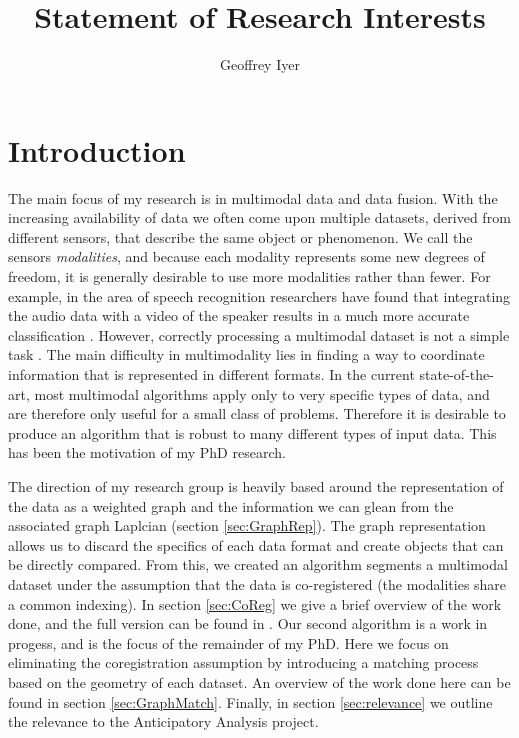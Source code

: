 \documentclass[journal]{IEEEtran}
\title{Statement of Research Interests}
\author{Geoffrey Iyer} \date{}
\begin{document}
\maketitle
\vspace*{-2cm}


\section{Introduction}
\label{sec:intro}

The main focus of my research is in multimodal data and data fusion. With the
increasing availability of data we often come upon multiple datasets, derived
from different sensors, that describe the same object or phenomenon. We call the
sensors \emph{modalities}, and because each modality represents some new degrees
of freedom, it is generally desirable to use more modalities rather than fewer.
For example, in the area of speech recognition researchers have found that
integrating the audio data with a video of the speaker results in a much more
accurate classification \cite{Potamianos03}. However, correctly processing a
multimodal dataset is not a simple task \cite{lahat:hal-01062366}. The main
difficulty in multimodality lies in finding a way to coordinate information that
is represented in different formats. In the current state-of-the-art, most
multimodal algorithms apply only to very specific types of data, and are
therefore only useful for a small class of problems. Therefore it is desirable
to produce an algorithm that is robust to many different types of input
data. This has been the motivation of my PhD research.

The direction of my research group is heavily based around the representation of
the data as a weighted graph and the information we can glean from the
associated graph Laplcian (section \ref{sec:GraphRep}). The graph representation
allows us to discard the specifics of each data format and create objects that
can be directly compared. From this, we created an algorithm segments a
multimodal dataset under the assumption that the data is co-registered (the
modalities share a common indexing).  In section \ref{sec:CoReg} we give a brief
overview of the work done, and the full version can be found in \cite{Iyer2017}.
Our second algorithm is a work in progess, and is the focus of the remainder of
my PhD. Here we focus on eliminating the coregistration assumption by
introducing a matching process based on the geometry of each dataset. An
overview of the work done here can be found in section
\ref{sec:GraphMatch}. Finally, in section \ref{sec:relevance} we outline the
relevance to the Anticipatory Analysis project.
\end{document}
